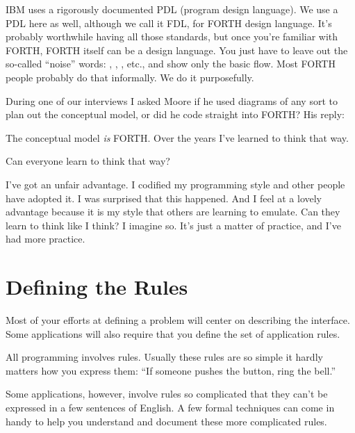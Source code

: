 \begin{tfquot}
IBM uses a rigorously documented PDL (program design language). We use
a PDL here as well, although we call it FDL, for FORTH design
language. It's probably worthwhile having all those standards, but
once you're familiar with FORTH, FORTH itself can be a design
language. You just have to leave out the so-called ``noise'' words:
, , , etc., and show only the basic
flow. Most FORTH people probably do that informally. We do it purposefully.
\end{tfquot}
During one of our interviews I asked Moore if he used
diagrams of any sort to plan out the conceptual model, or did he code
straight into FORTH? His reply:

\begin{tfquot}
The conceptual model \emph{is} FORTH. Over the years I've learned to think that way.
\end{tfquot}
Can everyone learn to think that way?

\begin{tfquot}
I've got an unfair advantage. I codified my programming style and other
people have adopted it. I was surprised that this happened. And I feel at a
lovely advantage because it is my style that others are learning to emulate.
Can they learn to think like I think? I imagine so. It's just a matter of
practice, and I've had more practice.
\end{tfquot}
\blackline{2ex}

\section{Defining the Rules}

Most of your efforts at defining a problem will center on describing the
interface.
Some applications will also require that you define the set of
application rules.
  
All programming involves rules. Usually these rules are so simple it
hardly matters how you express them: ``If someone pushes the button,
ring the bell.''

Some applications, however, involve rules so complicated that they
can't be expressed in a few sentences of English. A few formal techniques
can come in handy to help you understand and document these more
complicated rules.

